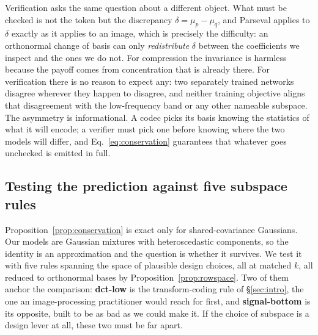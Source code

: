 \documentclass[10pt]{article}
\newcommand{\kk}{k}
\begin{document}
Verification asks the same question about a different object. What must be checked is not the token
but the discrepancy $\delta = \mu_p - \mu_q$, and Parseval applies to $\delta$ exactly as it applies
to an image, which is precisely the difficulty: an orthonormal change of basis can only
\emph{redistribute} $\delta$ between the coefficients we inspect and the ones we do not. For
compression the invariance is harmless because the payoff comes from concentration that is already
there. For verification there is no reason to expect any: two separately trained networks disagree
wherever they happen to disagree, and neither training objective aligns that disagreement with the
low-frequency band or any other nameable subspace. The asymmetry is informational. A codec picks its
basis knowing the statistics of what it will encode; a verifier must pick one before knowing where
the two models will differ, and Eq.~\ref{eq:conservation} guarantees that whatever goes unchecked is
emitted in full.

\subsection{Testing the prediction against five subspace rules}
\label{sec:metric}

Proposition~\ref{prop:conservation} is exact only for shared-covariance Gaussians. Our models are
Gaussian mixtures with heteroscedastic components, so the identity is an approximation and the
question is whether it survives. We test it with five rules spanning the space of plausible design
choices, all at matched $\kk$, all reduced to orthonormal bases by Proposition~\ref{prop:rowspace}.
Two of them anchor the comparison: \textbf{dct-low} is the transform-coding rule of \S\ref{sec:intro},
the one an image-processing practitioner would reach for first, and \textbf{signal-bottom} is its
opposite, built to be as bad as we could make it. If the choice of subspace is a design lever at all,
these two must be far apart.
\end{document}

